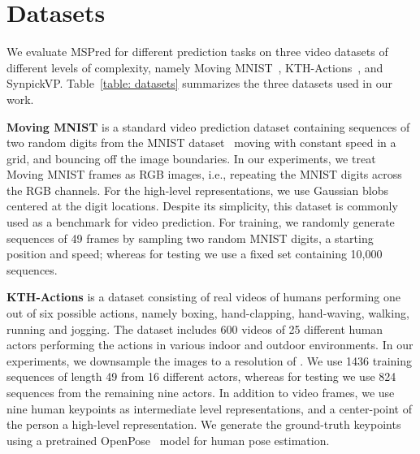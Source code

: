 \documentclass{bmvc2k}
\newcommand{\Table}[1]{Table~\ref{#1}}
\begin{document}




\setcounter{section}{0}
\renewcommand{\thesection}{\Alph{section}}

\vspace{-0.5cm}
\section{Datasets}
\label{section: datasets}

We evaluate MSPred for different prediction tasks on three video datasets of different levels of complexity, namely Moving MNIST~\cite{Srivastava_UnsupervisedLeaerningOfVideoRepresentationsUsingLSTMs_2015}, KTH-Actions~\cite{Schuldt_KTHRecognizingHumanActionsALocalSVMApproach_2004}, and SynpickVP.
\Table{table: datasets} summarizes the three datasets used in our work.

\textbf{Moving MNIST} is a standard video prediction dataset containing sequences of two random digits from the MNIST dataset~\cite{LeCun_MnistDataset_1998} moving with constant speed in a  grid, and bouncing off the image boundaries. In our experiments, we treat Moving MNIST frames as RGB images, i.e., repeating
the MNIST digits across the RGB channels. 
For the high-level representations, we use Gaussian blobs centered at the digit locations.
Despite its simplicity, this dataset is commonly used as a benchmark for video prediction.
For training, we randomly generate sequences of 49 frames by sampling two random MNIST digits, a starting position and speed; whereas for testing we use a fixed set containing 10,000 sequences.


\textbf{KTH-Actions} is a dataset consisting of real videos of humans performing one out of six possible actions, namely boxing, hand-clapping, hand-waving, walking, running and jogging. The dataset includes 600 videos of 25 different human actors performing the actions in various indoor and outdoor environments.
In our experiments, we downsample the images to a resolution of .
We use 1436 training sequences of length 49 from 16 different actors, whereas for testing we use 824 sequences from the remaining nine actors.
In addition to video frames, we use nine human keypoints as intermediate level representations, and a center-point of the person a high-level representation.
We generate the ground-truth keypoints using a pretrained OpenPose~\cite{Cao_RealTimePoseEstimationAffinityFields_2017} model for
human pose estimation.
\end{document}
